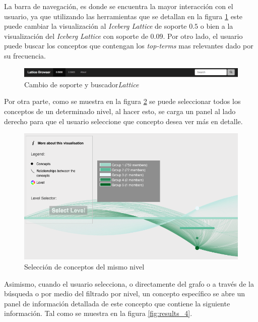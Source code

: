 \documentclass[12pt,oneside,letterpaper]{book}
\newcommand{\eng}[1]{\textit{#1}\xspace}			%
\theoremstyle{definition}
\begin{document}
\newpage

La barra de navegación, es donde se encuentra la mayor interacción con el usuario, ya que utilizando las herramientas que se detallan en la figura \ref{fig:results_2} este puede cambiar la visualización al \eng{Iceberg Lattice} de soporte $0.5$ o bien a la visualización del \eng{Iceberg Lattice} con soporte de $0.09$. Por otro lado, el usuario puede buscar los conceptos que contengan los \eng{top-terms} mas relevantes dado por su frecuencia.

\begin{figure}[h!]
	\centering
	\includegraphics[width=1\textwidth]{images/results_2.png}
	\caption{Cambio de soporte y buscador\eng{Lattice}}
	\label{fig:results_2}
\end{figure}


Por otra parte, como se muestra en la figura \ref{fig:results_3} se puede seleccionar todos los conceptos de un determinado nivel, al hacer esto, se carga un panel al lado derecho para que el usuario seleccione que concepto desea ver más en detalle.


\begin{figure}[h!]
	\centering
	\includegraphics[width=1\textwidth]{images/results_3.png}
	\caption{Selección de conceptos del mismo nivel}
	\label{fig:results_3}
\end{figure}


\newpage
Asimismo, cuando el usuario selecciona, o directamente del grafo o a través de la búsqueda o por medio del filtrado por nivel, un concepto específico se abre un panel de información detallada de este concepto que contiene la siguiente información. Tal como se muestra en la figura \ref{fig:results_4}.
\end{document}

